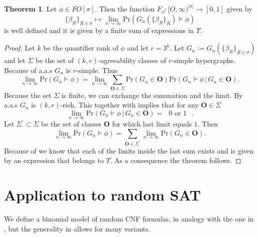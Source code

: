\documentclass[12pt,notitlepage,a4paper]{article}
\theoremstyle{definition}
\newtheorem{theorem}{Theorem}[section]
\newcommand{\Ln}{\lim\limits_{n\to \infty}}
\begin{document}
\begin{theorem}
	Let $\phi\in FO[\sigma]$. Then the function 
	$F_\phi: [O,\infty)^{|\sigma|}\rightarrow [0,1]$
	given by
	\[
	\{\beta_R\}_{R\in \sigma} \mapsto
	\Ln \mathrm{Pr} \left(
	G_n\left(\{\beta_R\}_{R}\right) \models \phi
	\right)
	\]
	is well defined and it is given by a finite sum of expressions
	in $\Upsilon$.
\end{theorem}
\begin{proof}
	Let $k$ be the quantifier rank of $\phi$ and
	let $r=3^k$. Let 
	$G_n:=G_n\left(\{\beta_R\}_{R\in \sigma}\right)$ and 
	let $\Sigma$ be the set of $(k,r)$-agreeability classes of 
	$r$-simple hypergraphs. Because of  a.a.s 
	$G_n$ is $r$-simple. Thus
	\begin{equation} \label{eq:aux1}
	\Ln \mathrm{Pr} \left(
	G_n \models \phi
	\right)=
	\Ln
	\sum_{\mathbf{O}\in \Sigma} \mathrm{Pr}\left(
	G_n\in \mathbf{O}
	\right)   
	\mathrm{Pr}\left(
	G_n\models \phi \,
	\Big| \,
	G_n\in \mathbf{O}
	\right).
	\end{equation}
	Because the set $\Sigma$ is finite, we can exchange the 
	summation and the limit. By  a.a.s 
	$G_n$ is $(k,r)$-rich. This together with 
	implies that for any $\mathbf{O}\in \Sigma$
	\[
	\Ln \mathrm{Pr}\left(
	G_n\models \phi \,
	\Big| \,
	G_n\in \mathbf{O}
	\right) = 
	\text{ $0$ or $1$ }.
	\]
	Let $\Sigma^\prime\subset \Sigma$ be the set of classes 
	$\mathbf{O}$ for which last limit equals $1$. Then
	\[
	\Ln \mathrm{Pr} \left(
	G_n \models \phi
	\right)=
	\sum_{\mathbf{O}\in \Sigma^\prime}
	\Ln \mathrm{Pr}\left(
	G_n \in \mathbf{O}
	\right).		
	\]
	Because of  we know that
	each of the limits inside the last sum exists and is given by
	an expression that belongs to $\Upsilon$. As a consequence the
	theorem follows. 	
\end{proof}

\section{Application to random SAT}\label{sec:SAT}

We define a binomial model of random CNF formulas, 
in analogy with the one in \cite{chvatal1992mick},
but the generality
in  allows for many variants. \par
\end{document}
